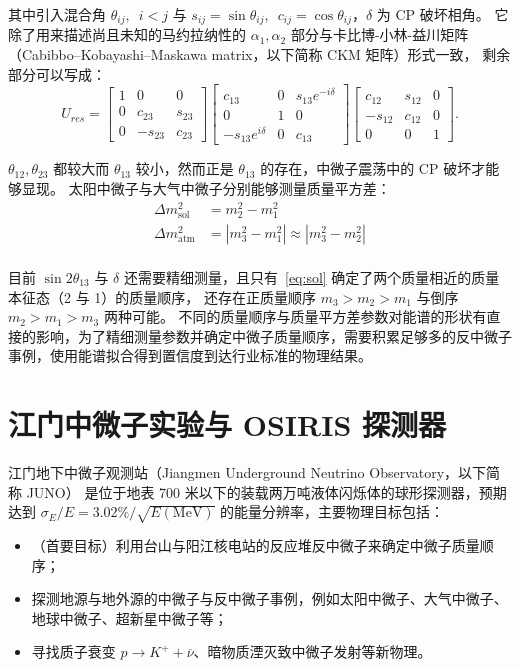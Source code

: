 其中引入混合角 $\theta_{ij},\enspace i<j$ 与 $s_{ij}=\sin{\theta_{ij}},\enspace c_{ij}=\cos{\theta_{ij}}$，$\delta$ 为 CP 破坏相角。
它除了用来描述尚且未知的马约拉纳性的 $\alpha_1,\alpha_2$ 部分与卡比博-小林-益川矩阵（Cabibbo–Kobayashi–Maskawa matrix，以下简称 CKM 矩阵）形式一致，
剩余部分可以写成：
\begin{equation}
    U_{res}=
    \begin{bmatrix}
    1&0&0\\0&c_{23}&s_{23}\\0&-s_{23}&c_{23}
    \end{bmatrix}
    \begin{bmatrix}
    c_{13}&0&s_{13}e^{-i\delta}\\0&1&0\\-s_{13}e^{i\delta}&0&c_{13}
    \end{bmatrix}
    \begin{bmatrix}
    c_{12}&s_{12}&0\\-s_{12}&c_{12}&0\\0&0&1
    \end{bmatrix}.
\end{equation}

$\theta_{12},\theta_{23}$ 都较大而 $\theta_{13}$ 较小，然而正是 $\theta_{13}$ 的存在，中微子震荡中的 CP 破坏才能够显现。
太阳中微子与大气中微子分别能够测量质量平方差：
\begin{align}
    \Delta m_{\text{sol}}^2&=m_2^2-m_1^2\label{eq:sol}\\
    \Delta m_{\text{atm}}^2&=\left|m_3^2-m_1^2\right|\approx\left|m_3^2-m_2^2\right|\label{eq:atm}\\
\end{align}

目前 $\sin{2\theta_{13}}$ 与 $\delta$ 还需要精细测量，且只有~\eqref{eq:sol} 确定了两个质量相近的质量本征态（2 与 1）的质量顺序，
还存在正质量顺序 $m_3>m_2>m_1$ 与倒序 $m_2>m_1>m_3$ 两种可能。
不同的质量顺序与质量平方差参数对能谱的形状有直接的影响，为了精细测量参数并确定中微子质量顺序，需要积累足够多的反中微子事例，使用能谱拟合得到置信度到达行业标准的物理结果。

\section{江门中微子实验与 OSIRIS 探测器}
江门地下中微子观测站（Jiangmen Underground Neutrino Observatory，以下简称 JUNO）\cite{JUNOPhysicsDetector2022}
是位于地表 700 米以下的装载两万吨液体闪烁体的球形探测器，预期达到 $\sigma_E/E=3.02\%/\sqrt{E(\text{MeV})}$ 的能量分辨率，主要物理目标包括：
\begin{itemize}
    \item （首要目标）利用台山与阳江核电站的反应堆反中微子来确定中微子质量顺序；
    \item 探测地源与地外源的中微子与反中微子事例，例如太阳中微子、大气中微子、地球中微子、超新星中微子等；
    \item 寻找质子衰变 $p\rightarrow K^{+}+\overline{\nu}$、暗物质湮灭致中微子发射等新物理。
\end{itemize}

